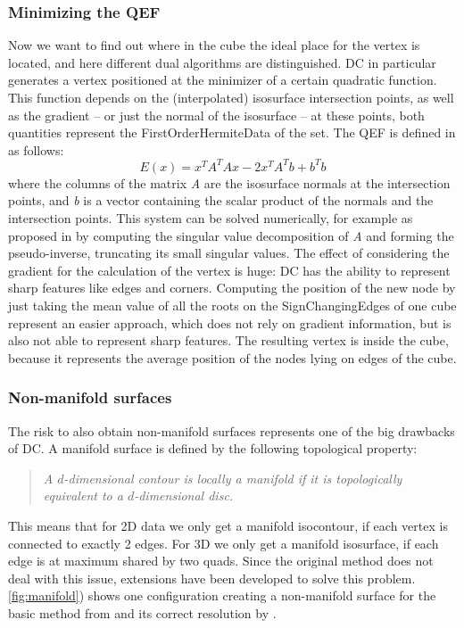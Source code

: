 \subsubsection{Minimizing the \acl{QEF}}
Now we want to find out where in the cube the ideal place for the vertex is located, and here different dual algorithms are distinguished. \Ac{DC} in particular generates a vertex positioned at the minimizer of a certain quadratic function. This function depends on the (interpolated) isosurface intersection points, as well as the gradient -- or just the normal of the isosurface -- at these points, both quantities represent the \acs{FirstOrderHermiteData} of the set.
The \acl{QEF} is defined in \cite{Hermite2002} as follows:
\begin{equation}
\label{eq:QEF}
E(x)= x^TA^TAx-2x^TA^Tb+b^Tb
\end{equation}
where the columns of the matrix \textit{A} are the  isosurface normals at the intersection points, and \textit{b} is a vector containing the scalar product of the normals and the intersection points. This system can be solved numerically, for example as proposed in \cite{Hermite2002} by computing the singular value decomposition of \textit{A} and forming the pseudo-inverse, truncating its small singular values. 
The effect of considering the gradient for the calculation of the vertex is huge: \ac{DC} has the ability to represent sharp features like edges and corners.
Computing the position of the new node by just taking the mean value of all the roots on the \acsp{SignChangingEdge} of one cube represent an easier approach, which does not rely on gradient information, but is also not able to represent sharp features. The resulting vertex is inside the cube, because it represents the average position of the nodes lying on edges of the cube.

\subsubsection{Non-manifold surfaces}
The risk to also obtain non-manifold surfaces represents one of the big drawbacks of \ac{DC}. A manifold surface is defined by the following topological property:
\begin{quote}
\emph{A $d$-dimensional contour is locally a \emph{manifold} if it is topologically equivalent to a $d$-dimensional disc.}\cite{Hermite2002}
\end{quote}
This means that for 2D data we only get a manifold isocontour, if each vertex is connected to exactly 2 edges. For 3D we only get a manifold isosurface, if each edge is at maximum shared by two \acp{quad}. Since the original method does not deal with this issue, extensions have been developed to solve this problem.\autoref{fig:manifold}) shows one configuration creating a non-manifold surface for the basic method from \cite{Hermite2002} and its correct resolution by \cite{Schaefer2007}.


